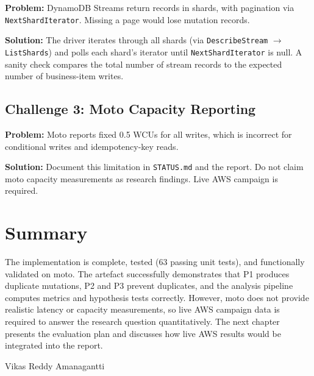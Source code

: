\textbf{Problem:} DynamoDB Streams return records in shards, with pagination via \texttt{NextShardIterator}. Missing a page would lose mutation records.

\textbf{Solution:} The driver iterates through all shards (via \texttt{DescribeStream} $\rightarrow$ \texttt{ListShards}) and polls each shard's iterator until \texttt{NextShardIterator} is null. A sanity check compares the total number of stream records to the expected number of business-item writes.

\subsection{Challenge 3: Moto Capacity Reporting}

\textbf{Problem:} Moto reports fixed 0.5 WCUs for all writes, which is incorrect for conditional writes and idempotency-key reads.

\textbf{Solution:} Document this limitation in \texttt{STATUS.md} and the report. Do not claim moto capacity measurements as research findings. Live AWS campaign is required.

\section{Summary}

The implementation is complete, tested (63 passing unit tests), and functionally validated on moto. The artefact successfully demonstrates that P1 produces duplicate mutations, P2 and P3 prevent duplicates, and the analysis pipeline computes metrics and hypothesis tests correctly. However, moto does not provide realistic latency or capacity measurements, so live AWS campaign data is required to answer the research question quantitatively. The next chapter presents the evaluation plan and discusses how live AWS results would be integrated into the report.

Vikas Reddy Amanagantti
